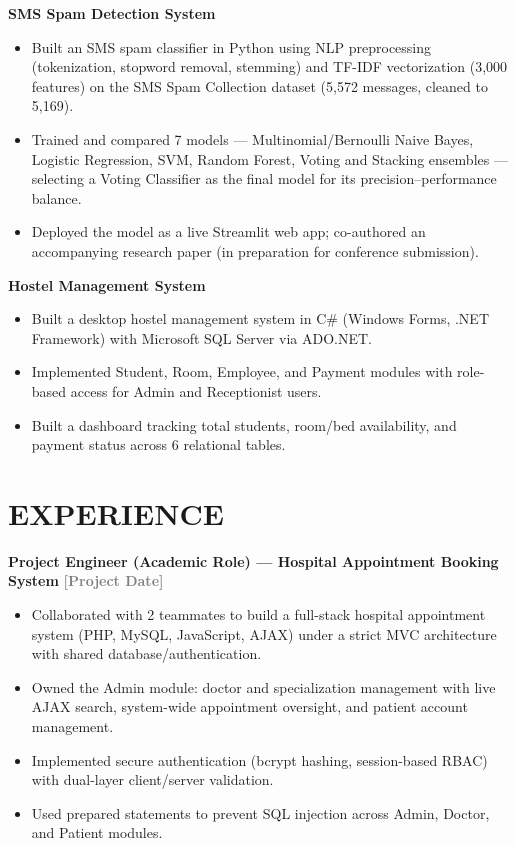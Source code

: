 \documentclass[9pt]{article}
\newenvironment{tightlist}{\begin{itemize}[leftmargin=13pt, itemsep=0pt, topsep=0pt, parsep=0pt]}{\end{itemize}}
\newcommand{\entry}[2]{%
  \textbf{#1} \hfill \textbf{\textcolor{graytext}{#2}}\par
}
\begin{document}
\textbf{SMS Spam Detection System}
\begin{tightlist}
  \item Built an SMS spam classifier in Python using NLP preprocessing (tokenization, stopword removal, stemming) and TF-IDF vectorization (3{,}000 features) on the SMS Spam Collection dataset (5{,}572 messages, cleaned to 5{,}169).
  \item Trained and compared 7 models --- Multinomial/Bernoulli Naive Bayes, Logistic Regression, SVM, Random Forest, Voting and Stacking ensembles --- selecting a Voting Classifier as the final model for its precision--performance balance.
  \item Deployed the model as a live Streamlit web app; co-authored an accompanying research paper (in preparation for conference submission).
\end{tightlist}

\textbf{Hostel Management System}
\begin{tightlist}
  \item Built a desktop hostel management system in C\# (Windows Forms, .NET Framework) with Microsoft SQL Server via ADO.NET.
  \item Implemented Student, Room, Employee, and Payment modules with role-based access for Admin and Receptionist users.
  \item Built a dashboard tracking total students, room/bed availability, and payment status across 6 relational tables.
\end{tightlist}

\section*{EXPERIENCE}

\entry{Project Engineer (Academic Role) --- Hospital Appointment Booking System}{[Project Date]}
\begin{tightlist}
  \item Collaborated with 2 teammates to build a full-stack hospital appointment system (PHP, MySQL, JavaScript, AJAX) under a strict MVC architecture with shared database/authentication.
  \item Owned the Admin module: doctor and specialization management with live AJAX search, system-wide appointment oversight, and patient account management.
  \item Implemented secure authentication (bcrypt hashing, session-based RBAC) with dual-layer client/server validation.
  \item Used prepared statements to prevent SQL injection across Admin, Doctor, and Patient modules.
\end{tightlist}
\end{document}
